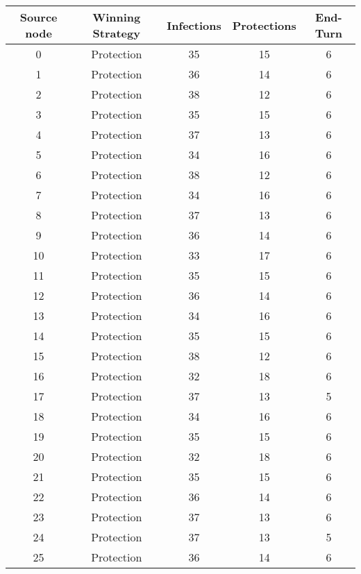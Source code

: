 \documentclass[results.tex]{subfiles}
\begin{document}
\begin{center}
  \begin{tabular}{| c || c | c | c | c |}
    \hline
    {\bfseries Source node} & {\bfseries Winning Strategy} & {\bfseries Infections} & {\bfseries Protections} & {\bfseries End-Turn} \\  %
    \hline\hline
    0 & Protection & 35 & 15 & 6 \\ 
    \hline
    1 & Protection & 36 & 14 & 6 \\ 
    \hline
    2 & Protection & 38 & 12 & 6 \\ 
    \hline
    3 & Protection & 35 & 15 & 6 \\ 
    \hline
    4 & Protection & 37 & 13 & 6 \\ 
    \hline
    5 & Protection & 34 & 16 & 6 \\ 
    \hline
    6 & Protection & 38 & 12 & 6 \\ 
    \hline
    7 & Protection & 34 & 16 & 6 \\ 
    \hline
    8 & Protection & 37 & 13 & 6 \\ 
    \hline
    9 & Protection & 36 & 14 & 6 \\ 
    \hline
    10 & Protection & 33 & 17 & 6 \\ 
    \hline
    11 & Protection & 35 & 15 & 6 \\ 
    \hline
    12 & Protection & 36 & 14 & 6 \\ 
    \hline
    13 & Protection & 34 & 16 & 6 \\ 
    \hline
    14 & Protection & 35 & 15 & 6 \\ 
    \hline
    15 & Protection & 38 & 12 & 6 \\ 
    \hline
    16 & Protection & 32 & 18 & 6 \\ 
    \hline
    17 & Protection & 37 & 13 & 5 \\ 
    \hline
    18 & Protection & 34 & 16 & 6 \\ 
    \hline
    19 & Protection & 35 & 15 & 6 \\ 
    \hline
    20 & Protection & 32 & 18 & 6 \\ 
    \hline
    21 & Protection & 35 & 15 & 6 \\ 
    \hline
    22 & Protection & 36 & 14 & 6 \\ 
    \hline
    23 & Protection & 37 & 13 & 6 \\ 
    \hline
    24 & Protection & 37 & 13 & 5 \\ 
    \hline
    25 & Protection & 36 & 14 & 6 \\ 

\end{tabular}
\end{center}
\end{document}
